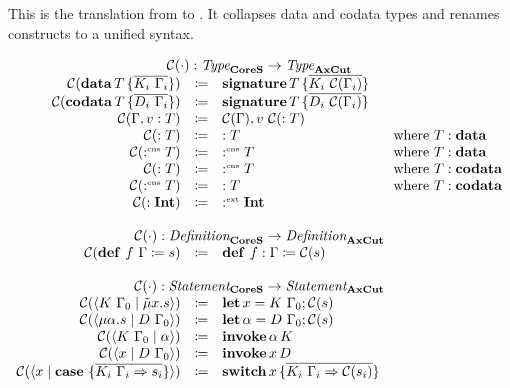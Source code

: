 This is the translation from \targetsub{} to \machinelang.
It collapses data and codata types and renames constructs to a unified syntax.

\[
  \begin{array}{rcll}
    \multicolumn{4}{c}{\collapse{\cdot} : \emph{Type}_{\targetsub{}} \rightarrow \emph{Type}_{\machinelang{}}}\\
    \collapse{\data{T}{\overline{K_i\ \Gamma_i}}}{} & \coloneq & \sig{T}{\overline{K_i\ \collapse{\Gamma_i}}} & \\
    \collapse{\codata{T}{\overline{D_i\ \Gamma_i}}}{} & \coloneq & \sig{T}{\overline{D_i\ \collapse{\Gamma_i}}} & \\
    \collapse{\Gamma, v : T}{} & \coloneq & \collapse{\Gamma}{}, v\ \collapse{: T} & \\
    \collapse{: T} & \coloneq & : T & \text{where } T : \mathbf{data} \\
    \collapse{\cnt T} & \coloneq & \cnt T & \text{where } T : \mathbf{data} \\
    \collapse{: T} & \coloneq & \cnt T & \text{where } T : \mathbf{codata} \\
    \collapse{\cnt T} & \coloneq & : T & \text{where } T : \mathbf{codata} \\
    \collapse{: \tyint} & \coloneq & \ext \tyint & \\
    \\
    \multicolumn{4}{c}{\collapse{\cdot} : \emph{Definition}_{\targetsub{}} \rightarrow \emph{Definition}_{\machinelang{}}}\\
    \collapse{\defi{f\ \Gamma}{s}} & \coloneq & \defi{f : \Gamma}{\collapse{s}} & \\
    \\
    \multicolumn{4}{c}{\collapse{\cdot} : \emph{Statement}_{\targetsub{}} \rightarrow \emph{Statement}_{\machinelang{}}}\\
    \collapse{\cut{K\ \Gamma_0}{\tilde{\mu}x.s}} & \coloneq & \letac{x}{K\ \Gamma_0}{\collapse{s}} & \\
    \collapse{\cut{\mu\alpha.s}{D\ \Gamma_0}} & \coloneq & \letac{\alpha}{D\ \Gamma_0}{\collapse{s}} & \\
    \collapse{\cut{K\ \Gamma_0}{\alpha}} & \coloneq & \invoke{\alpha}{K} & \\
    \collapse{\cut{x}{D\ \Gamma_0}} & \coloneq & \invoke{x}{D} & \\
    \collapse{\cut{x}{\case{\overline{K_i\ \Gamma_i \Rightarrow s_i}}}} & \coloneq & \switch{x}{\bra{\overline{K_i\ \Gamma_i \Rightarrow \collapse{s_i}}}} & \\

\end{array}\]
